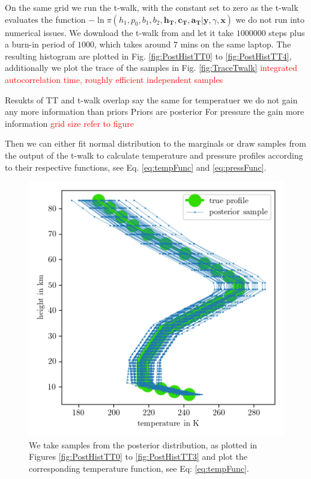 On the same grid we run the t-walk, with the constant set to zero as the t-walk evaluates the function $- \ln{\pi(h_1,p_0,b_1,b_2,\bm{h_T},\bm{c_T},\bm{a_T} | \bm{y}, \gamma, \bm{x}) }$ we do not run into numerical issues.
We download the t-walk from \cite{christentwalkaccess} and let it take $1000000$ steps plus a burn-in period of $1000$, which takes around $7$ mins on the same laptop.
The resulting histogram are plotted in Fig. \ref{fig:PostHistTT0} to \ref{fig:PostHistTT4}, additionally we plot the trace of the samples in Fig. \ref{fig:TraceTwalk}
\textcolor{red}{integrated autocorrelation time, roughly efficient independent samples}
\clearpage

Resukts of TT and t-walk overlap say the same
for temperatuer we do not gain any more information than priors
Priors are posterior
For pressure the  gain more information
\textcolor{red}{grid size refer to figure}

Then we can either fit normal distribution to the marginals or draw samples from the output of the t-walk to calculate temperature and pressure profiles according to their respective functions, see Eq. \ref{eq:tempFunc} and \ref{eq:pressFunc}.
\begin{figure}[ht!]
	\centering
	\includegraphics{TempPostMeanSigm.png} 
	\caption[Temperature posterior samples.]{We take samples from the posterior distribution, as plotted in Figures \ref{fig:PostHistTT0} to \ref{fig:PostHistTT3} and plot the corresponding temperature function, see Eq: \ref{eq:tempFunc}. }
	\label{fig:TempPost}
\end{figure}


